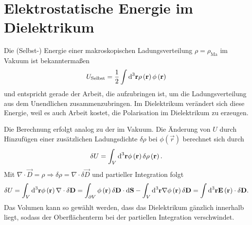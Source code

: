 \section{Elektrostatische Energie im Dielektrikum}

Die (Selbst-) Energie einer makroskopischen Ladungsverteilung $\rho =\rho _{\mathrm{Ma}}$ im Vakuum ist bekanntermaßen
\begin{equation*}
	U_{\text{Selbst}}=\frac{1}{2}\int \text{d} ^{3}\mathbf{r}\rho \left(\mathbf{r}\right)\phi \left(\mathbf{r}\right)
\end{equation*}
und entspricht gerade der Arbeit, die aufzubringen ist, um die Ladungsverteilung aus dem Unendlichen zusammenzubringen. Im Dielektrikum verändert sich diese Energie, weil es auch Arbeit kostet, die Polarisation im Dielektrikum zu erzeugen.

Die Berechnung erfolgt analog zu der im Vakuum. Die Änderung von $U$ durch Hinzufügen einer zusätzlichen Ladungsdichte $\delta \rho $ bei $\phi \left(\vec {r}\right)$ berechnet sich durch
\begin{equation*}
	\delta U=\int _{V}\text{d} ^{3}\mathbf{r}\phi \left(\mathbf{r}\right)\delta \rho \left(\mathbf{r}\right).
\end{equation*}
Mit $\nabla \cdot \vec {D}=\rho \Rightarrow \delta \rho =\nabla \cdot \delta \vec {D}$ und partieller Integration folgt
\begin{equation*}
	\delta U=\int _{V}\text{d} ^{3}\mathbf{r}\phi \left(\mathbf{r}\right)\nabla \cdot \delta \mathbf{D}=\int _{\partial V}\phi \left(\mathbf{r}\right)\delta \mathbf{D}\cdot \text{d} \mathbf{S}-\int _{V}\text{d} ^{3}\mathbf{r}\nabla \phi \left(\mathbf{r}\right)\delta \mathbf{D}=\int \text{d} ^{3}\mathbf{r}\mathbf{E}\left(\mathbf{r}\right)\cdot \delta \mathbf{D}.
\end{equation*}
Das Volumen kann so gewählt werden, dass das Dielektrikum gänzlich innerhalb liegt, sodass der Oberflächenterm bei der partiellen Integration verschwindet.

